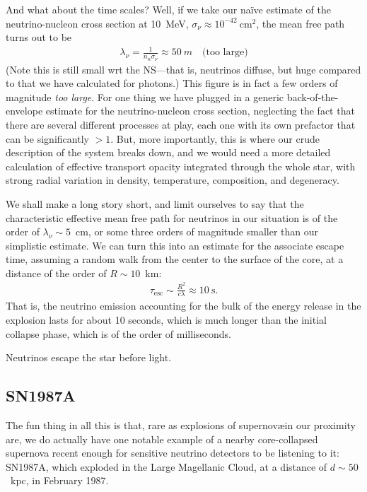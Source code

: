 And what about the time scales? Well, if we take our na\"ive estimate of the
neutrino-nucleon cross section at 10~MeV, $\sigma_\nu \approx 10^{-42}~\text{cm}^2$,
the mean free path turns out to be
\begin{align*}
  \lambda_\nu = \frac{1}{n_n \sigma_\nu} \approx 50~m \quad\text{(too large)}
\end{align*}
(Note this is still small wrt the NS---that is, neutrinos diffuse, but huge compared
to that we have calculated for photons.) This figure is in fact a few orders of
magnitude \emph{too large}. For one thing we have plugged in a generic back-of-the-envelope
estimate for the neutrino-nucleon cross section, neglecting the fact that there
are several different processes at play, each one with its own prefactor that can
be significantly $> 1$. But, more importantly, this is where our crude description of
the system breaks down, and we would need a more detailed calculation of
effective transport opacity integrated through the whole star, with strong radial
variation in density, temperature, composition, and degeneracy.

We shall make a long story short, and limit ourselves to say that the characteristic
effective mean free path for neutrinos in our situation is of the order of
$\lambda_\nu \sim 5$~cm, or some three orders of magnitude smaller than our
simplistic estimate. We can turn this into an estimate for the associate escape
time, assuming a random walk from the center to the surface of the core, at a
distance of the order of $R \sim 10$~km:
\begin{align}
  \tau_\text{esc} \sim \frac{R^2}{c\lambda} \approx 10~\text{s}.
\end{align}
That is, the neutrino emission accounting for the bulk of the energy release in
the explosion lasts for about 10 seconds, which is much longer than the initial collapse
phase, which is of the order of milliseconds.







Neutrinos escape the star before light.


\subsection{SN1987A}

The fun thing in all this is that, rare as explosions of supernov\ae in our
proximity are, we do actually have one notable example of a nearby core-collapsed
supernova recent enough for sensitive neutrino detectors to be listening to it:
SN1987A, which exploded in the Large Magellanic Cloud, at a distance of
$d \sim 50$~kpc, in February 1987.

